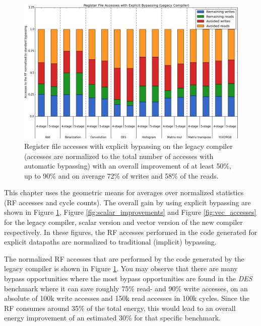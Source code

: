 \begin{figure}[b!]
\centering
\hspace*{-.12in}
\includegraphics[width=.875\textwidth]{figures/stats/legacy_accesses}
\caption{Register file accesses with explicit bypassing on the legacy compiler (accesses are normalized to the total number of accesses with automatic bypassing) with an overall improvement of at least 50\%, up to 90\% and on average 72\% of writes and 58\% of the reads.} %
\label{fig:legacy_access_improvements}
\end{figure}

This chapter uses the geometric means for averages over normalized statistics (RF accesses and cycle counts). The overall gain by using explicit bypassing are shown in Figure \ref{fig:legacy_access_improvements}, Figure \ref{fig:scalar_improvements} and Figure \ref{fig:vec_accesses} for the legacy compiler, scalar version and vector version of the new compiler respectively. In these figures, the RF accesses performed in the code generated for explicit datapaths are normalized to traditional (implicit) bypassing.





The normalized RF accesses that are performed by the code generated by the legacy compiler is shown in Figure \ref{fig:legacy_access_improvements}. You may observe that there are many bypass opportunities where the most bypass opportunities are found in the \emph{DES} benchmark where it can save roughly 75\% read- and 90\% write accesses, on an absolute of 100k write accesses and 150k read accesses in 100k cycles. Since the RF consumes around 35\% of the total energy, this would lead to an overall energy improvement of an estimated 30\% for that specific benchmark.




